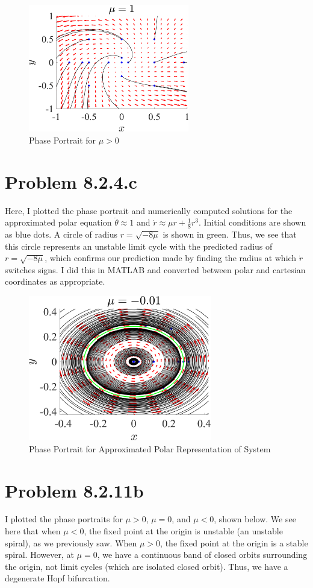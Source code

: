 \documentclass[11pt]{article}
\begin{document}
\begin{figure}[h]
\includegraphics[width=7cm]{Hopf_823_phase_mu1.png}
\caption{Phase Portrait for $\mu > 0$}
\end{figure}
\clearpage

\section*{Problem 8.2.4.c}
Here, I plotted the phase portrait and numerically computed solutions for the approximated polar equation $\dot \theta \approx 1$ and $\dot r \approx \mu r + \frac{1}{8} r^3$. Initial conditions are shown as blue dots. A circle of radius $r = \sqrt{-8 \mu}$ is shown in green. Thus, we see that this circle represents an unstable limit cycle with the predicted radius of $r = \sqrt{-8 \mu}$, which confirms our prediction made by finding the radius at which $\dot r$ switches signs. I did this in MATLAB and converted between polar and cartesian coordinates as appropriate.

\begin{figure}[h]
\centering
\includegraphics[width=8cm]{Heuristic_824.png}
\caption{Phase Portrait for Approximated Polar Representation of System}
\end{figure}
\clearpage

\section*{Problem 8.2.11b}
I plotted the phase portraits for $\mu > 0$, $\mu = 0$, and $\mu < 0$, shown below. We see here that when $\mu < 0$, the fixed point at the origin is unstable (an unstable spiral), as we previously saw. When $\mu > 0$, the fixed point at the origin is a stable spiral. However, at $\mu = 0$, we have a continuous band of closed orbits surrounding the origin, not limit cycles (which are isolated closed orbit). Thus, we have a degenerate Hopf bifurcation. 
\end{document}
